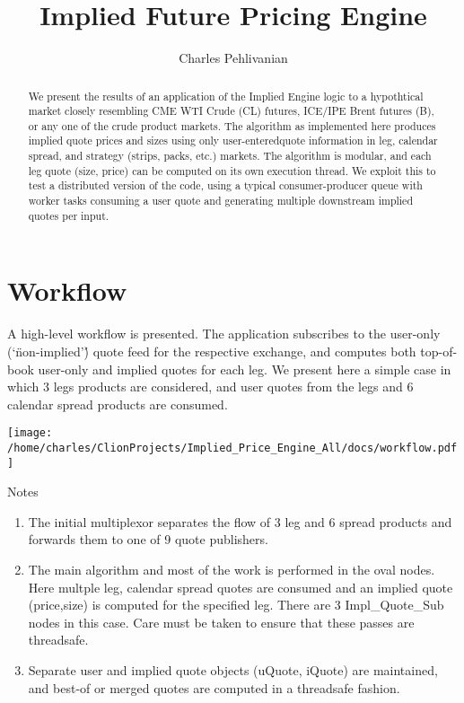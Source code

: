 \documentclass{article}
\begin{document}
\title{Implied Future Pricing Engine}
\author{Charles Pehlivanian}

\maketitle

\begin{abstract}

We present the results of an application of the Implied Engine logic to a hypothtical market closely resembling CME WTI Crude (CL) futures, ICE/IPE Brent futures (B), or any one of the crude product markets. The algorithm as implemented here produces implied quote prices and sizes using only user-enteredquote information in leg, calendar spread, and strategy (strips, packs, etc.) markets. The algorithm is modular, and each leg quote (size, price) can be computed on its own execution thread. We exploit this to test a distributed version of the code, using a typical consumer-producer queue with worker tasks consuming a user quote and generating multiple downstream implied quotes per input. 
\end{abstract}

\section*{Workflow}
A high-level workflow is presented. The application subscribes to the user-only (`\"non-implied'\') quote feed for the respective exchange, and computes both top-of-book user-only and implied quotes for each leg. We present here a simple case in which 3 legs products are considered, and user quotes from the legs and 6 calendar spread products are consumed.

\texttt{[image: /home/charles/ClionProjects/Implied\_Price\_Engine\_All/docs/workflow.pdf]}

Notes
\begin{enumerate}
\item The initial multiplexor separates the flow of 3 leg and 6 spread products and forwards them to one of 9 quote publishers.
\item The main algorithm and most of the work is performed in the oval nodes. Here multple leg, calendar spread quotes are consumed and an implied quote (price,size) is computed for the specified leg. There are 3 Impl{\_}Quote{\_}Sub nodes in this case. Care must be taken to ensure that these passes are threadsafe.
\item Separate user and implied quote objects (uQuote, iQuote) are maintained, and best-of or merged quotes are computed in a threadsafe fashion.
\end{enumerate}
\end{document}
